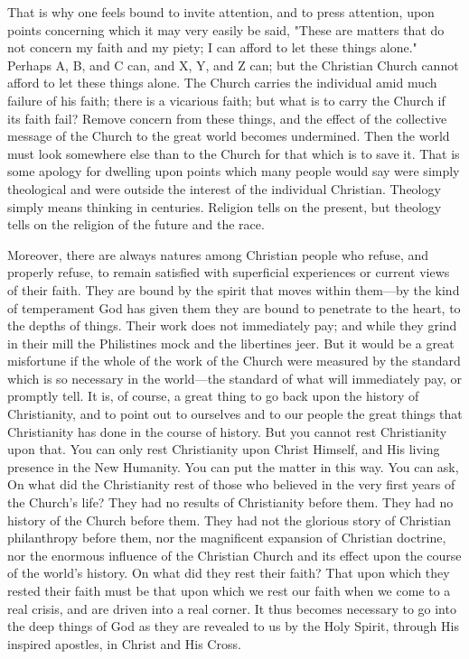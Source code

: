 \documentclass[12pt,letterpaper,oneside]{book}
\begin{document}
That is why one feels bound to invite attention, 
and to press attention, upon points concerning 
which it may very easily be said, "These 
are matters that do not concern my faith and 
my piety; I can afford to let these things alone." 
Perhaps A, B, and C can, and X, Y, and Z can; 
but the Christian Church cannot afford to let 
these things alone. The Church carries the 
individual amid much failure of his faith; 
there is a vicarious faith; but what is to 
carry the Church if its faith fail? Remove 
concern from these things, and the effect of 
the collective message of the Church to the 
great world becomes undermined. Then the 
world must look somewhere else than to the 
Church for that which is to save it. That is 
some apology for dwelling upon points which 
many people would say were simply theological 
and were outside the interest of the individual 
Christian. Theology simply means thinking in 
centuries. Religion tells on the present, but 
theology tells on the religion of the future 
and the race. 

Moreover, there are always natures among 
Christian people who refuse, and properly 
refuse, to remain satisfied with superficial 
experiences or current views of their faith. 
They are bound by the spirit that moves 
within them---by the kind of temperament God 
has given them they are bound to penetrate 
to the heart, to the depths of things. Their 
work does not immediately pay; and while they 
grind in their mill the Philistines mock and the 
libertines jeer. But it would be a great misfortune 
if the whole of the work of the Church 
were measured by the standard which is so 
necessary in the world---the standard of what 
will immediately pay, or promptly tell. It is, 
of course, a great thing to go back upon the 
history of Christianity, and to point out to ourselves 
and to our people the great things that 
Christianity has done in the course of history. 
But you cannot rest Christianity upon that. 
You can only rest Christianity upon Christ 
Himself, and His living presence in the New 
Humanity. You can put the matter in this 
way. You can ask, On what did the Christianity 
rest of those who believed in the very 
first years of the Church's life? They had no 
results of Christianity before them. They had 
no history of the Church before them. They 
had not the glorious story of Christian 
philanthropy before them, nor the magnificent 
expansion of Christian doctrine, nor the enormous
influence of the Christian Church and its 
effect upon the course of the world's history. 
On what did they rest their faith? That upon 
which they rested their faith must be that upon 
which we rest our faith when we come to a 
real crisis, and are driven into a real corner. 
It thus becomes necessary to go into the deep 
things of God as they are revealed to us by the 
Holy Spirit, through His inspired apostles, in 
Christ and His Cross. 
\end{document}
